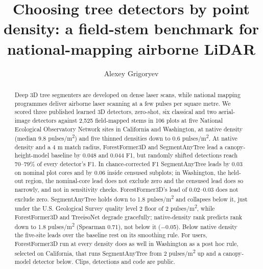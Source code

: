 \documentclass[preprint,12pt,authoryear,a4paper]{elsarticle}
\begin{document}
\begin{frontmatter}

\title{Choosing tree detectors by point density: a field-stem benchmark for national-mapping airborne LiDAR}

\author[aff1]{Alexey Grigoryev}

\begin{abstract}
Deep 3D tree segmenters are developed on dense laser scans, while national
mapping programmes deliver airborne laser scanning at a few pulses per square
metre. We scored three published learned 3D detectors, zero-shot, six classical
and two aerial-image detectors against 2,525 field-mapped stems in 106 plots at
five National Ecological Observatory Network sites in California and Washington,
at native density (median 9.8 pulses/m\textsuperscript{2}) and five thinned densities down to 0.6
pulses/m\textsuperscript{2}. At native density and a 4 m match radius, ForestFormer3D and
SegmentAnyTree lead a canopy-height-model baseline by 0.048 and 0.044 F1, but
randomly shifted detections reach 70--79\% of every detector's F1. In
chance-corrected F1 SegmentAnyTree leads by 0.03 on nominal plot cores and by
0.06 inside censused subplots; in Washington, the held-out region, the
nominal-core lead does not exclude zero and the censused lead does so narrowly,
and not in sensitivity checks. ForestFormer3D's lead of 0.02--0.03 does not
exclude zero. SegmentAnyTree holds down to 1.8 pulses/m\textsuperscript{2} and
collapses below it, just under the U.S. Geological Survey quality level 2 floor
of 2 pulses/m\textsuperscript{2}, while ForestFormer3D and TreeisoNet degrade gracefully;
native-density rank predicts rank down to 1.8 pulses/m\textsuperscript{2} (Spearman 0.71), not
below it ($-$0.05). Below native density the five-site leads over the baseline
rest on its smoothing rule. For users, ForestFormer3D run at every density does
as well in Washington as a post hoc rule, selected on California, that runs
SegmentAnyTree from 2 pulses/m\textsuperscript{2} up and a canopy-model detector below. Clips,
detections and code are public.
\end{abstract}


\end{frontmatter}
\end{document}
